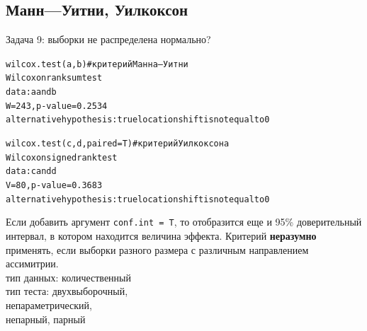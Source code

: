 \subsection{Манн—Уитни, Уилкоксон}
\begin{frame}{Задача 9: выборки не распределена нормально?}
\scriptsize
\begin{alltt}
\alert{wilcox.test(a, b)} \hfill \# критерий Манна—Уитни\medskip\\
Wilcoxon rank sum test\\
data:  a and b\\
W = 243, p-value = 0.2534
alternative hypothesis: true location shift is not equal to 0
\end{alltt}
\normalsize
\vfill
\scriptsize
\begin{alltt}
\alert{wilcox.test(c,d, paired = T)}\hfill \# критерий Уилкоксона\medskip\\
Wilcoxon signed rank test\\
data:  c and d\\
\alert{V = 80, p-value = 0.3683}\\
alternative hypothesis: true location shift is not equal to 0
\end{alltt}
\normalsize
\vfill
Если добавить аргумент \scriptsize\verb"conf.int = T"\normalsize, то отобразится еще и  95\% доверительный интервал, в котором находится величина эффекта.
\vfill
\alert{Критерий \textbf{неразумно} применять, если выборки разного размера с различным направлением ассимитрии.}\\
тип данных: количественный\\
тип теста: двухвыборочный,\\
непараметрический,\\
непарный, парный\\
\end{frame}

